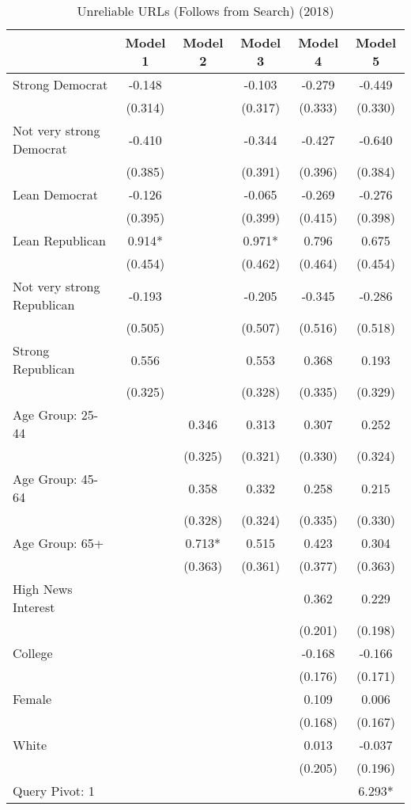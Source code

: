 \begin{table}

\caption{Unreliable URLs (Follows from Search) (2018)}
\centering
\begin{tabular}[t]{lccccc}
\toprule
  & Model 1 & Model 2 & Model 3 & Model 4 & Model 5\\
\midrule
Strong Democrat & -0.148 &  & -0.103 & -0.279 & -0.449\\
 & (0.314) &  & (0.317) & (0.333) & (0.330)\\
Not very strong Democrat & -0.410 &  & -0.344 & -0.427 & -0.640\\
 & (0.385) &  & (0.391) & (0.396) & (0.384)\\
Lean Democrat & -0.126 &  & -0.065 & -0.269 & -0.276\\
 & (0.395) &  & (0.399) & (0.415) & (0.398)\\
Lean Republican & 0.914* &  & 0.971* & 0.796 & 0.675\\
 & (0.454) &  & (0.462) & (0.464) & (0.454)\\
Not very strong Republican & -0.193 &  & -0.205 & -0.345 & -0.286\\
 & (0.505) &  & (0.507) & (0.516) & (0.518)\\
Strong Republican & 0.556 &  & 0.553 & 0.368 & 0.193\\
 & (0.325) &  & (0.328) & (0.335) & (0.329)\\
Age Group: 25-44 &  & 0.346 & 0.313 & 0.307 & 0.252\\
 &  & (0.325) & (0.321) & (0.330) & (0.324)\\
Age Group: 45-64 &  & 0.358 & 0.332 & 0.258 & 0.215\\
 &  & (0.328) & (0.324) & (0.335) & (0.330)\\
Age Group: 65+ &  & 0.713* & 0.515 & 0.423 & 0.304\\
 &  & (0.363) & (0.361) & (0.377) & (0.363)\\
High News Interest &  &  &  & 0.362 & 0.229\\
 &  &  &  & (0.201) & (0.198)\\
College &  &  &  & -0.168 & -0.166\\
 &  &  &  & (0.176) & (0.171)\\
Female &  &  &  & 0.109 & 0.006\\
 &  &  &  & (0.168) & (0.167)\\
White &  &  &  & 0.013 & -0.037\\
 &  &  &  & (0.205) & (0.196)\\
Query Pivot: 1 &  &  &  &  & 6.293*\\

\end{tabular}
\end{table}
